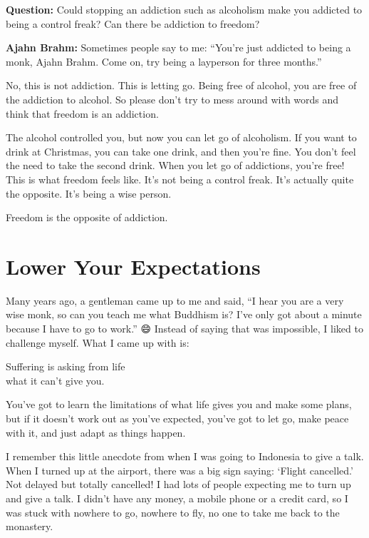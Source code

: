 \documentclass[12pt, openany]{book}
\newenvironment{aphorism}%
{%
\begin{center}\begin{itshape}
}%
{\end{itshape}\end{center}
}%
\begin{document}
\textbf{Question:} Could stopping an addiction such as alcoholism make you addicted to being a control freak? Can there be addiction to freedom? 

\textbf{Ajahn Brahm:} Sometimes people say to me: “You’re just addicted to being a monk, Ajahn Brahm. Come on, try being a layperson for three months.” 

No, this is not addiction. This is letting go. Being free of alcohol, you are free of the addiction to alcohol. So please don’t try to mess around with words and think that freedom is an addiction. 

The alcohol controlled you, but now you can let go of alcoholism. If you want to drink at Christmas, you can take one drink, and then you’re fine. You don’t feel the need to take the second drink. When you let go of addictions, you’re free! This is what freedom feels like. It’s not being a control freak. It’s actually quite the opposite. It’s being a wise person. 

\begin{aphorism}
Freedom is the opposite of addiction.
\end{aphorism}

\chapter{Lower Your Expectations} 

Many years ago, a gentleman came up to me and said, “I hear you are a very wise monk, so can you teach me what Buddhism is? I’ve only got about a minute because I have to go to work.” 😄 Instead of saying that was impossible, I liked to challenge myself. What I came up with is: 

\begin{aphorism}
Suffering is asking from life\\  
what it can’t give you.
\end{aphorism}

You’ve got to learn the limitations of what life gives you and make some plans, but if it doesn’t work out as you’ve expected, you’ve got to let go, make peace with it, and just adapt as things happen. 

I remember this little anecdote from when I was going to Indonesia to give a talk. When I turned up at the airport, there was a big sign saying: ‘Flight cancelled.’ Not delayed but totally cancelled! I had lots of people expecting me to turn up and give a talk. I didn’t have any money, a mobile phone or a credit card, so I was stuck with nowhere to go, nowhere to fly, no one to take me back to the monastery. 
\end{document}
